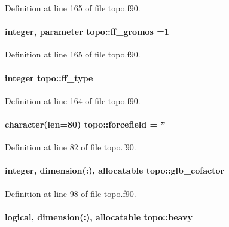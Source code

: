 Definition at line 165 of file topo.\-f90.

\hypertarget{classtopo_a225be5b395f0b592cf0689d27febd07b}{
\paragraph[{ff\-\_\-gromos}]{\setlength{\rightskip}{0pt plus 5cm}integer, parameter topo\-::ff\-\_\-gromos =1}}\label{classtopo_a225be5b395f0b592cf0689d27febd07b}


Definition at line 165 of file topo.\-f90.

\hypertarget{classtopo_a3ecd180b85daedebf2f6fa7b4e8046e4}{
\paragraph[{ff\-\_\-type}]{\setlength{\rightskip}{0pt plus 5cm}integer topo\-::ff\-\_\-type}}\label{classtopo_a3ecd180b85daedebf2f6fa7b4e8046e4}


Definition at line 164 of file topo.\-f90.

\hypertarget{classtopo_a8ae816563184073254a1590f00d34844}{
\paragraph[{forcefield}]{\setlength{\rightskip}{0pt plus 5cm}character(len=80) topo\-::forcefield = ''}}\label{classtopo_a8ae816563184073254a1590f00d34844}


Definition at line 82 of file topo.\-f90.

\hypertarget{classtopo_a0c4a7c684dc6cb8009204fa4ff5a415b}{
\paragraph[{glb\-\_\-cofactor}]{\setlength{\rightskip}{0pt plus 5cm}integer, dimension(\-:), allocatable topo\-::glb\-\_\-cofactor}}\label{classtopo_a0c4a7c684dc6cb8009204fa4ff5a415b}


Definition at line 98 of file topo.\-f90.

\hypertarget{classtopo_add92afa3ae9b74baac3b28ec0c65b5bd}{
\paragraph[{heavy}]{\setlength{\rightskip}{0pt plus 5cm}logical, dimension(\-:), allocatable topo\-::heavy}}\label{classtopo_add92afa3ae9b74baac3b28ec0c65b5bd}


